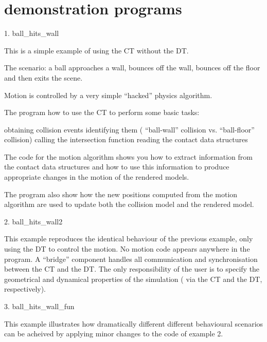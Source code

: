 \documentclass[11pt]{article}
\begin{document}
%

\section{ demonstration programs }

1. ball\_hits\_wall\

This is a simple example of using the CT without the DT.

The scenario: a ball approaches a wall, bounces off the wall, bounces off
the floor and then exits the scene.

Motion is controlled by a very simple ``hacked'' physics algorithm.

The program how to use the CT to perform some basic tasks:

obtaining collision events
identifying them ( ``ball-wall'' collision vs. ``ball-floor'' collision)
calling the intersection function
reading the contact data structures

The code for the motion algorithm shows you how to extract information
from the contact data structures and how to use this information to produce 
appropriate changes in the motion of the rendered models.

The program also show how the new positions computed from the motion
algorithm are used to update both the collision model and the rendered
model.

2. ball\_hits\_wall2

This example reproduces the identical behaviour of the previous example,
only using the DT to control the motion.
No motion code appears anywhere in the program.
A ``bridge'' component handles all communication and synchronisation
between the CT and the DT. The only responsibility of the user is to
specify the geometrical and dynamical properties of the simulation ( via
the CT and the DT, respectively). 

3. ball\_hits\_wall_fun

This example illustrates how dramatically different different behavioural
scenarios can be acheived by applying minor changes to the code of example
2.
\end{document}
